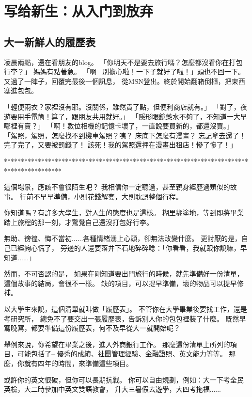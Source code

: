 
\chapter{写给新生：从入门到放弃}

\section{大一新鮮人的履歷表}


凌晨兩點，還在看朋友的blog。
「你明天不是要去旅行嗎？怎麼都沒看你在打包行李？」 媽媽有點著急。
「啊~ 別擔心啦！一下子就好了啦！」頭也不回一下。
又過了一陣子，回覆完最後一個訊息， 從MSN登出。終於開始翻箱倒櫃，把東西塞進包包。

「輕便雨衣？家裡沒有耶。沒關係，雖然貴了點，但便利商店就有。」
「對了，夜遊要用手電筒！算了，跟朋友共用就好。」
「隱形眼鏡藥水不夠了，不知道一大早哪裡有賣？」
「啊！數位相機的記憶卡壞了，一直說要買新的，都還沒買。」
「駕照，駕照，怎麼找不到機車駕照？咦？ 床底下怎麼有漫畫？
忘記拿去還了！完了完了，又要被罰錢了！
該死！我的駕照還押在漫畫出租店！慘了慘了！」

*****************************************************************************************

這個場景，應該不會很陌生吧？
我相信你一定聽過，甚至親身經歷過類似的故事。
行前不早早準備，小則花錢解套，大則耽誤整個行程。

你知道嗎？有許多大學生，對人生的態度也是這樣。
糊里糊塗地，等到即將畢業踏上旅程的那一刻，才驚覺自己還沒打包好行李。

無助、徬徨、悔不當初......各種情緒湧上心頭，卻無法改變什麼。
更討厭的是，自己已經夠心慌了，
旁邊的人還要落井下石地碎碎唸：「你看看，我就跟你說嘛，早知道......」

然而，不可否認的是， 如果在剛知道要出門旅行的時候，就先準備好一份清單，
這個故事的結局，會很不一樣。
缺的項目，可以提早準備，壞的物品可以提早修補。

以大學生來說，這個清單就叫做「履歷表」。
不管你在大學畢業後要找工作，還是考研究所， 總免不了要交出一張履歷表，告訴別人你的包包裡裝了什麼。 既然早寫晚寫，都要準備這份履歷表，何不及早從大一就開始呢？

舉例來說，你希望在畢業之後，進入外商銀行工作。 那麼這份清單上所列的項目，可能包括了-- 優秀的成績、社團管理經驗、金融證照、英文能力等等。 那麼，你就有四年的時間，來準備這些項目。

或許你的英文很破，但你可以長期抗戰。 你可以自由規劃，例如：大一下考全民英檢，大二時參加中英文雙語教會， 升大三暑假去遊學，大四考拖福......

